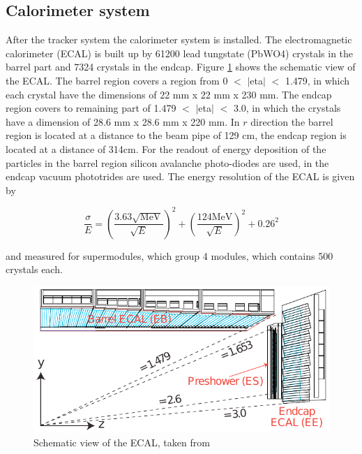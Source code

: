 \subsection*{Calorimeter system}

After the tracker system the calorimeter system is installed. The electromagnetic calorimeter (\gls{ECAL}) \cite{CMS2, ECAL} is built up by 61200 lead tungstate (\gls{PbWO4}) crystals in the barrel part and 7324 crystals in the endcap. Figure \ref{fig:fig_2_8} shows the schematic view of the \gls{ECAL}. The barrel region covers a region from 0 $<$ $|$\gls{eta}$|$ $<$ 1.479, in which each crystal have the dimensions of 22 mm x 22 mm x 230 mm. The endcap region covers to remaining part of 1.479 $<$ $|$\gls{eta}$|$ $<$ 3.0, in which the crystals have a dimension of 28.6 mm x 28.6 mm x 220 mm. In $r$ direction the barrel region is located at a distance to the beam pipe of 129 cm, the endcap region is located at a distance of 314cm. For the readout of energy deposition of the particles in the barrel region silicon avalanche photo-diodes are used, in the endcap vacuum phototrides are used. The energy resolution of the \gls{ECAL} is given by

\begin{equation}
	\label{eq:eq_2_4}
	\frac{\sigma}{E} = (\frac{3.63 \sqrt{\text{MeV}}}{\sqrt{E}})^2 + (\frac{124 \text{MeV}}{\sqrt{E}})^2 + 0.26^{2}
\end{equation}

and measured for supermodules, which group 4 modules, which contains 500 crystals each. \\

\begin{figure}[ht]
	\centering
	\includegraphics[width=1\textwidth]{pictures/CMS_ElectromagneticCalorimeter.pdf}

	\caption[Electromagnetic calorimeter of CMS]{Schematic view of the \gls{ECAL}, taken from \cite{CMS2}}
	\label{fig:fig_2_8}
\end{figure}

